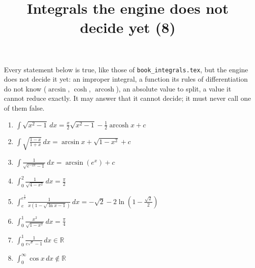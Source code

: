 \documentclass[11pt,a4paper]{article}
\title{Integrals the engine does not decide yet (8)}
\author{}
\date{}
\begin{document}
\maketitle
Every statement below is true, like those of \texttt{book\_integrals.tex}, but the engine does not decide it yet: an improper integral, a function its rules of differentiation do not know ($\arcsin$, $\cosh$, $\operatorname{arcosh}$), an absolute value to split, a value it cannot reduce exactly. It may answer that it cannot decide; it must never call one of them false.

\begin{enumerate}
\item $\displaystyle \int \sqrt{x^{2} - 1} \, dx = \frac{x}{2}\sqrt{x^{2} - 1} - \frac{1}{2}\operatorname{arcosh} x + c$
\item $\displaystyle \int \sqrt{\frac{1 - x}{1 + x}} \, dx = \arcsin x + \sqrt{1 - x^{2}} + c$
\item $\displaystyle \int \frac{1}{\sqrt{e^{-2x} - 1}} \, dx = \arcsin\left(e^{x}\right) + c$
\item $\displaystyle \int_{0}^{2} \frac{1}{\sqrt{4 - x^{2}}} \, dx = \frac{\pi}{2}$
\item $\displaystyle \int_{e}^{e^{\frac{3}{2}}} \frac{1}{x\left(1 - \sqrt{\ln x - 1}\right)} \, dx = -\sqrt{2} - 2\ln\left(1 - \frac{\sqrt{2}}{2}\right)$
\item $\displaystyle \int_{0}^{1} \frac{x^{2}}{\sqrt{1 - x^{2}}} \, dx = \frac{\pi}{4}$
\item $\displaystyle \int_{0}^{1} \frac{1}{e^{\sqrt{x}} - 1} \, dx \in \mathbb{R}$
\item $\displaystyle \int_{0}^{\infty} \cos x \, dx \notin \mathbb{R}$
\end{enumerate}
\end{document}
